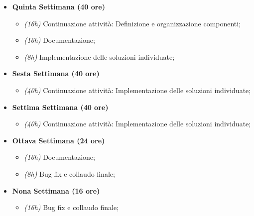 {\begin{itemize}
\begin{itemize}
        \end{itemize}
        \item \textbf{Quinta Settimana (40 ore)} 
        \begin{itemize}
            \item \textit{(16h)} Continuazione attività: Definizione e organizzazione componenti;
            \item \textit{(16h)} Documentazione;
            \item \textit{(8h)} Implementazione delle soluzioni individuate;
        \end{itemize}
        \item \textbf{Sesta Settimana (40 ore)} 
        \begin{itemize}
            \item \textit{(40h)} Continuazione attività: Implementazione delle soluzioni individuate;
        \end{itemize}
        \item \textbf{Settima Settimana (40 ore)} 
        \begin{itemize}
            \item \textit{(40h)} Continuazione attività: Implementazione delle soluzioni individuate;
        \end{itemize}
        \item \textbf{Ottava Settimana (24 ore)} 
        \begin{itemize}
            \item \textit{(16h)} Documentazione;
            \item \textit{(8h)} Bug fix e collaudo finale;
        \end{itemize}
        \item \textbf{Nona Settimana (16 ore)} 
	    \begin{itemize}
	    	\item \textit{(16h)} Bug fix e collaudo finale;
	    \end{itemize}
    \end{itemize}
}

\newcommand{\totaleOre}{320}

\newcommand{\obiettiviObbligatori}{
	 \item \underline{\textit{O01}}: Realizzazione del componente "Hydrogen Custom Logon" per \textit{MacOs Mojave};
	 \item \underline{\textit{O02}}: Realizzazione di un installer del componente per \textit{MacOs Mojave};
	 \item \underline{\textit{O03}}: Documentazione di progetto;
	 
}

